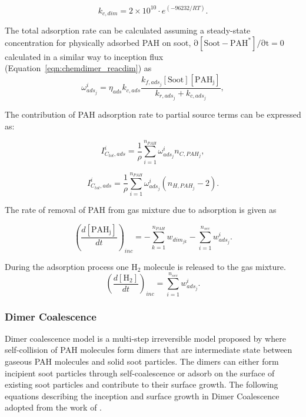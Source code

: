 \begin{equation}
	k_{c,dim} = 2\times10^{10}\cdot e^{(-96232/RT)}
	\label{eqn:kcads_reacdim}.
\end{equation}


The total adsorption rate can be calculated assuming a steady-state concentration for physically adsorbed PAH on soot, $\mathrm{\partial{[{Soot-PAH^*}]}/\partial t = 0}$ calculated in a similar way to inception flux (Equation~\eqref{eqn:chemdimer_reacdim}) as\\

\begin{equation}
	\omega^i_{ads_j} = \eta_{ads} k_{c,ads}\frac{k_{f,ads_j}[\mathrm{Soot}][\mathrm{PAH_j}]}{k_{r,ads_j}+k_{c,ads_j}}
	\label{eqn:wads_reacdim},
\end{equation}

The contribution of PAH adsorption rate to partial source terms can be expressed as:

\begin{equation}
	I^i_{C_{tot},ads} =
	\frac{1}{\rho}
	\sum_{i=1}^{n_{PAH}}
	\omega^i_{ads_j}
	n_{C,PAH_j}
	\label{eqn:ICtotads_reacdim},
\end{equation}

\begin{equation}
	I^i_{C_{tot},ads} =
	\frac{1}{\rho}
	\sum_{i=1}^{n_{PAH}}
	\omega^i_{ads_j}
	\left(n_{H,PAH_j}-2\right)
	\label{eqn:IHtotads_reacdim}.
\end{equation}

The rate of removal of PAH from gas mixture due to adsorption is given as

\begin{equation}
	\left(
	\frac{d\left[{\mathrm{PAH_j}}\right]}{dt}
	\right)_{inc}
	= 
	-\sum_{k=1}^{n_{PAH}}w_{dim_{jk}}-\sum_{i=1}^{n_{sec}}w^i_{ads_j}
	\label{eqn:PAHscrub_reacdim}.
\end{equation}

During the adsorption process one $\mathrm{H_2}$ molecule is released to the gas mixture.
\begin{equation}
	\left(
	\frac{d\left[{\mathrm{H_2}}\right]}{dt}
	\right)_{inc}
	= 
	\sum_{i=1}^{n_{sec}}w^i_{ads_j}
	\label{eqn:H2scrub_reacdim}.
\end{equation}

\subsubsection{Dimer Coalescence}
Dimer coalescence model is a multi-step irreversible model proposed by \citet{blanquart2009joint} where self-collision of PAH molecules form dimers that are intermediate state between gaseous PAH molecules and solid soot particles. The dimers can either form incipient soot particles through self-coalescence or adsorb on the surface of existing soot particles and contribute to their surface growth. The following equations describing the inception and surface growth in Dimer Coalescence adopted from the work of \citet{sun2021modelling}.


